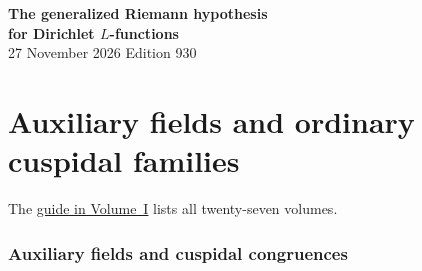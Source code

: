 \documentclass[a4paper,11pt]{article}
\theoremstyle{definition}
\theoremstyle{remark}
\numberwithin{equation}{section}
\begin{document}
\setcounter{part}{6}
\thispagestyle{plain}\begin{center}
{\LARGE\bfseries The generalized Riemann hypothesis\\[2pt]for Dirichlet \(L\)-functions}\\[6pt]
{\small 27 November 2026 \quad\textperiodcentered\quad Edition 930}\end{center}
\part{Auxiliary fields and ordinary cuspidal families}\label{part:VII}
\begin{abstract}\noindent An auxiliary quadratic field supplies the characters for ordinary cuspidal congruences. We follow these congruences along cyclotomic layers and recover strict classes from the traces of the three-character deformation.\end{abstract}
\setcounter{section}{35}
\noindent The \hyperref[seriesguide]{guide in Volume~I} lists all twenty-seven volumes.
\begingroup\small\setlength{\parskip}{0pt}\tableofcontents\endgroup
\clearpage

\section{Auxiliary fields and cuspidal congruences}\label{nav:g-IV-5}\label{nav:volume-VII}
\end{document}
